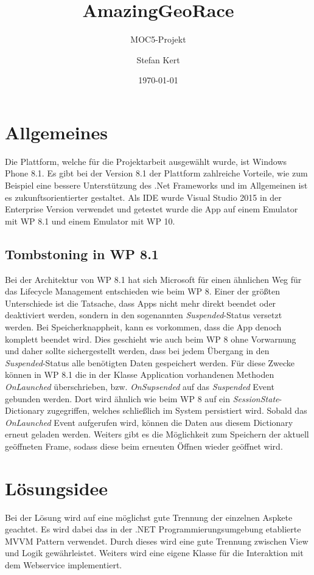 \documentclass[a4paper,ngerman]{scrartcl}
\begin{document}
\title{AmazingGeoRace}
\subtitle{MOC5-Projekt}
\author{Stefan Kert}
\date{\today}
\maketitle
\section{Allgemeines}
Die Plattform, welche für die Projektarbeit ausgewählt wurde, ist Windows Phone 8.1. Es gibt bei der Version 8.1 der Plattform zahlreiche Vorteile, wie zum Beispiel eine bessere Unterstützung des .Net Frameworks und im Allgemeinen ist es zukunftsorientierter gestaltet. Als IDE wurde Visual Studio 2015 in der Enterprise Version verwendet und getestet wurde die App auf einem Emulator mit WP 8.1 und einem Emulator mit WP 10. 

\subsection{Tombstoning in WP 8.1}
Bei der Architektur von WP 8.1 hat sich Microsoft für einen ähnlichen Weg für das Lifecycle Management entschieden wie beim WP 8. Einer der größten Unterschiede ist die Tatsache, dass Apps nicht mehr direkt beendet oder deaktiviert werden, sondern in den sogenannten \textit{Suspended}-Status versetzt werden. Bei Speicherknappheit, kann es vorkommen, dass die App denoch komplett beendet wird. Dies geschieht wie auch beim WP 8 ohne Vorwarnung und daher sollte sichergestellt werden, dass bei jedem Übergang in den \textit{Suspended}-Status alle benötigten Daten gespeichert werden. Für diese Zwecke können in WP 8.1 die in der Klasse Application vorhandenen Methoden \textit{OnLaunched} überschrieben, bzw. \textit{OnSupsended} auf das \textit{Suspended} Event gebunden werden. Dort wird ähnlich wie beim WP 8 auf ein \textit{SessionState}-Dictionary zugegriffen, welches schließlich im System persistiert wird. Sobald das \textit{OnLaunched} Event aufgerufen wird, können die Daten aus diesem Dictionary erneut geladen werden. Weiters gibt es die Möglichkeit zum Speichern der aktuell geöffneten Frame, sodass diese beim erneuten Öffnen wieder geöffnet wird. 

\section{Lösungsidee}
Bei der Lösung wird auf eine möglichst gute Trennung der einzelnen Aspkete geachtet. Es wird dabei das in der .NET Programmierungsumgebung etablierte MVVM Pattern  verwendet. Durch dieses wird eine gute Trennung zwischen View und Logik gewährleistet. Weiters wird eine eigene Klasse für die Interaktion mit dem Webservice implementiert. 
\end{document}
